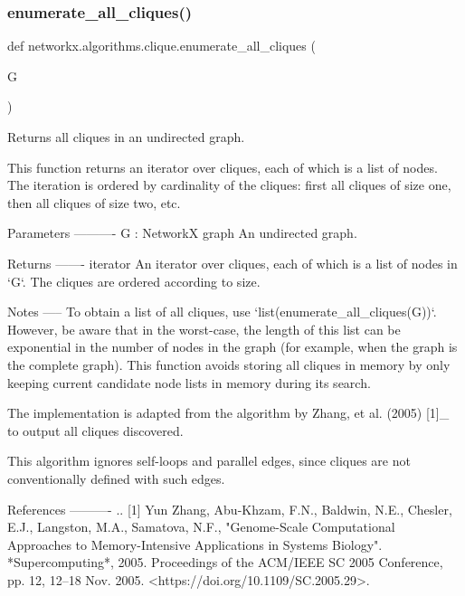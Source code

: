 \subsubsection{\texorpdfstring{enumerate\+\_\+all\+\_\+cliques()}{enumerate\_all\_cliques()}}
{\footnotesize\ttfamily def networkx.\+algorithms.\+clique.\+enumerate\+\_\+all\+\_\+cliques (\begin{DoxyParamCaption}\item[{}]{G }\end{DoxyParamCaption})}

\begin{DoxyVerb}Returns all cliques in an undirected graph.

This function returns an iterator over cliques, each of which is a
list of nodes. The iteration is ordered by cardinality of the
cliques: first all cliques of size one, then all cliques of size
two, etc.

Parameters
----------
G : NetworkX graph
    An undirected graph.

Returns
-------
iterator
    An iterator over cliques, each of which is a list of nodes in
    `G`. The cliques are ordered according to size.

Notes
-----
To obtain a list of all cliques, use
`list(enumerate_all_cliques(G))`. However, be aware that in the
worst-case, the length of this list can be exponential in the number
of nodes in the graph (for example, when the graph is the complete
graph). This function avoids storing all cliques in memory by only
keeping current candidate node lists in memory during its search.

The implementation is adapted from the algorithm by Zhang, et
al. (2005) [1]_ to output all cliques discovered.

This algorithm ignores self-loops and parallel edges, since cliques
are not conventionally defined with such edges.

References
----------
.. [1] Yun Zhang, Abu-Khzam, F.N., Baldwin, N.E., Chesler, E.J.,
       Langston, M.A., Samatova, N.F.,
       "Genome-Scale Computational Approaches to Memory-Intensive
       Applications in Systems Biology".
       *Supercomputing*, 2005. Proceedings of the ACM/IEEE SC 2005
       Conference, pp. 12, 12--18 Nov. 2005.
       <https://doi.org/10.1109/SC.2005.29>.\end{DoxyVerb}
 \mbox{\label{namespacenetworkx_1_1algorithms_1_1clique_a9e5f7c53376e84c56ea967a673b8c6bc}} 
